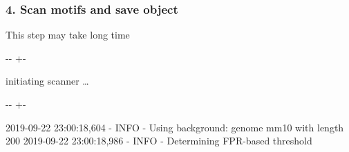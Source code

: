 \documentclass[letterpaper,10pt,english]{sphinxmanual}
\newlength\nbsphinxcodecellspacing
\begin{document}
\subsubsection{4. Scan motifs and save object}
\label{\detokenize{notebooks/02_motif_scan/02_atac_peaks_to_TFinfo_with_celloracle_190901:4.-Scan-motifs-and-save-object}}
This step may take long time

{
\begin{sphinxVerbatim}[commandchars=\\\{\}]
\llap{\color{nbsphinxin}[15]:\,\hspace{\fboxrule}\hspace{\fboxsep}}
 

\end{sphinxVerbatim}
}

{

\kern-\sphinxverbatimsmallskipamount\kern-\baselineskip
\kern+\FrameHeightAdjust\kern-\fboxrule
\vspace{\nbsphinxcodecellspacing}

\begin{sphinxVerbatim}[commandchars=\\\{\}]
initiating scanner {\ldots}
\end{sphinxVerbatim}
}

{

\kern-\sphinxverbatimsmallskipamount\kern-\baselineskip
\kern+\FrameHeightAdjust\kern-\fboxrule
\vspace{\nbsphinxcodecellspacing}

\begin{sphinxVerbatim}[commandchars=\\\{\}]
2019-09-22 23:00:18,604 - INFO - Using background: genome mm10 with length 200
2019-09-22 23:00:18,986 - INFO - Determining FPR-based threshold
\end{sphinxVerbatim}
}
\end{document}
